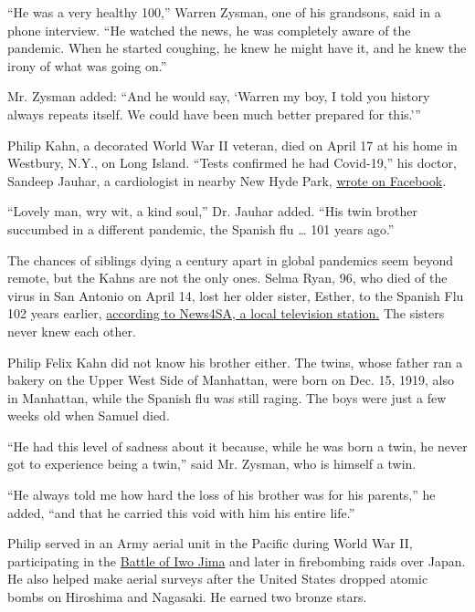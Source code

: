 ``He was a very healthy 100,'' Warren Zysman, one of his grandsons, said
in a phone interview. ``He watched the news, he was completely aware of
the pandemic. When he started coughing, he knew he might have it, and he
knew the irony of what was going on.''

Mr. Zysman added: ``And he would say, `Warren my boy, I told you history
always repeats itself. We could have been much better prepared for
this.'''

Philip Kahn, a decorated World War II veteran, died on April 17 at his
home in Westbury, N.Y., on Long Island. ``Tests confirmed he had
Covid-19,'' his doctor, Sandeep Jauhar, a cardiologist in nearby New
Hyde Park, \href{https://www.facebook.com/sandeepjauhar}{wrote on
Facebook}.

``Lovely man, wry wit, a kind soul,'' Dr. Jauhar added. ``His twin
brother succumbed in a different pandemic, the Spanish flu \ldots{} 101
years ago.''

The chances of siblings dying a century apart in global pandemics seem
beyond remote, but the Kahns are not the only ones. Selma Ryan, 96, who
died of the virus in San Antonio on April 14, lost her older sister,
Esther, to the Spanish Flu 102 years earlier,
\href{https://news4sanantonio.com/news/local/woman-dies-from-coronavirus-102-years-after-sister-died-in-spanish-flu-pandemic}{according
to News4SA, a local television station.} The sisters never knew each
other.

Philip Felix Kahn did not know his brother either. The twins, whose
father ran a bakery on the Upper West Side of Manhattan, were born on
Dec. 15, 1919, also in Manhattan, while the Spanish flu was still
raging. The boys were just a few weeks old when Samuel died.

``He had this level of sadness about it because, while he was born a
twin, he never got to experience being a twin,'' said Mr. Zysman, who is
himself a twin.

``He always told me how hard the loss of his brother was for his
parents,'' he added, ``and that he carried this void with him his entire
life.''

Philip served in an Army aerial unit in the Pacific during World War II,
participating in the
\href{https://www.history.com/topics/world-war-ii/battle-of-iwo-jima}{Battle
of Iwo Jima} and later in firebombing raids over Japan. He also helped
make aerial surveys after the United States dropped atomic bombs on
Hiroshima and Nagasaki. He earned two bronze stars.

